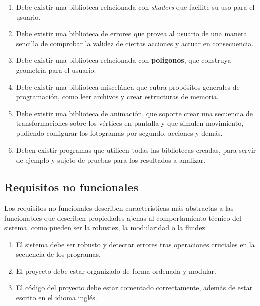 \begin{enumerate}

    \item Debe existir una biblioteca relacionada con \textit{shaders} que facilite su uso para el usuario.

    \item Debe existir una biblioteca de errores que provea al usuario de una manera sencilla de comprobar la validez de ciertas acciones y actuar en consecuencia.

    \item Debe existir una biblioteca relacionada con \textbf{polígonos}, que construya geometría para el usuario.

    \item Debe existir una biblioteca miscelánea que cubra propósitos generales de programación, como leer archivos y crear estructuras de memoria.

    \item Debe existir una biblioteca de animación, que soporte crear una secuencia de transformaciones sobre los vértices en pantalla y que simulen movimiento, pudiendo configurar los fotogramas por segundo, acciones y demás.

    \item Deben existir programas que utilicen todas las bibliotecas creadas, para servir de ejemplo y sujeto de pruebas para los resultados a analizar.

\end{enumerate}

\subsection{Requisitos no funcionales}\label{sub:non-functional-requirement}
Los requisitos no funcionales describen características más abstractas a las funcionables que describen propiedades ajenas al comportamiento técnico del sistema, como pueden ser la robustez, la modularidad o la fluidez.

\begin{enumerate}

    \item El sistema debe ser robusto y detectar errores tras operaciones cruciales en la secuencia de los programas.
    
    \item El proyecto debe estar organizado de forma ordenada y modular.

    \item El código del proyecto debe estar comentado correctamente, además de estar escrito en el idioma inglés.
    
\end{enumerate}

